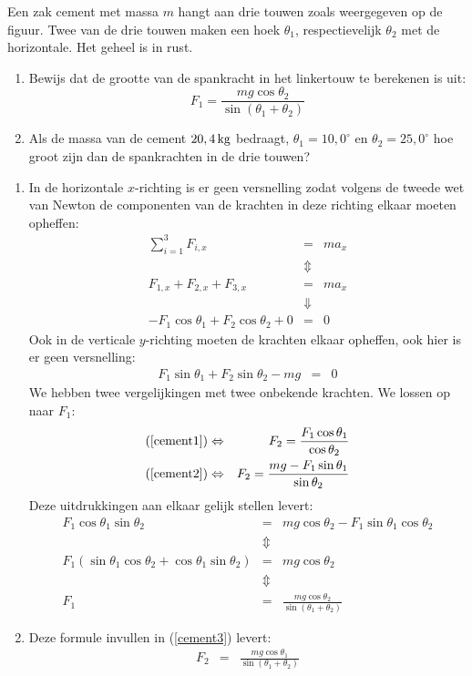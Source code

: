 \begin{exercise} Een zak cement met massa $m$ hangt aan drie touwen zoals weergegeven op de figuur. Twee van de drie touwen maken een hoek $\theta_1$, respectievelijk $\theta_2$ met de horizontale. Het geheel is in rust.
\begin{enumerate}
\item Bewijs dat de grootte van de spankracht in het linkertouw te berekenen is uit:
\[
F_1=\frac{mg\cos{\theta_2}}{\sin{(\theta_1+\theta_2)}}
\]
\item Als de massa van de cement $20,4\rm\,kg$ bedraagt, $\theta_1=10,0^\circ$ en $\theta_2=25,0^\circ$ hoe groot zijn dan de spankrachten in de drie touwen?
\end{enumerate}
\begin{oplossing}
\begin{enumerate}
\item In de horizontale $x$-richting is er geen versnelling zodat volgens de tweede wet van Newton de componenten van de krachten in deze rich\-ting elkaar moeten opheffen:
\begin{eqnarray}
\sum_{i=1}^3F_{i,x}&=&ma_x\nonumber\\
&\Updownarrow&\nonumber\\
F_{1,x}+F_{2,x}+F_{3,x}&=&ma_x\nonumber\\
&\Downarrow&\nonumber\\
-F_1\cos{\theta_1}+F_2\cos{\theta_2}+0&=&0\label{cement1}
\end{eqnarray}
Ook in de verticale $y$-richting moeten de krachten elkaar opheffen,
ook hier is er geen versnelling:
\begin{eqnarray}
F_1\sin{\theta_1}+F_2\sin{\theta_2}-mg&=&0\label{cement2}
\end{eqnarray}
We hebben twee vergelijkingen met twee onbekende krachten. We lossen
op naar $F_1$:
\begin{eqnarray}
(\ref{cement1})&\Leftrightarrow&F_2=\frac{F_1\cos{\theta_1}}{\cos{\theta_2}}\label{cement3}\\
(\ref{cement2})&\Leftrightarrow&F_2=\frac{mg-F_1\sin{\theta_1}}{\sin{\theta_2}}\nonumber
\end{eqnarray}
Deze uitdrukkingen aan elkaar gelijk stellen levert:
\begin{eqnarray*}
F_1\cos{\theta_1}\sin{\theta_2}&=&mg\cos{\theta_2}-F_1\sin{\theta_1}\cos{\theta_2}\\
&\Updownarrow&\\
F_1(\sin{\theta_1}\cos{\theta_2}+\cos{\theta_1}\sin{\theta_2})&=&mg\cos{\theta_2}\\
&\Updownarrow&\\
F_1&=&\frac{mg\cos{\theta_2}}{\sin{(\theta_1+\theta_2)}}
\end{eqnarray*}
\item Deze formule invullen in (\ref{cement3}) levert:
\begin{eqnarray*}
F_2&=&\frac{mg\cos{\theta_1}}{\sin{(\theta_1+\theta_2)}}
\end{eqnarray*}
\end{enumerate}
\end{oplossing}


\end{exercise}

